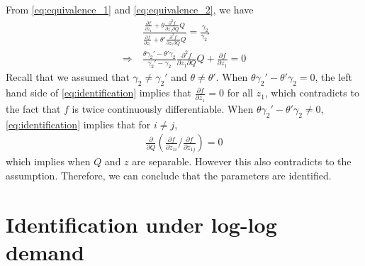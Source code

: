 \documentclass[11pt, a4paper]{article}
\numberwithin{figure}{section}
\theoremstyle{definition}
\newcommand{\0}{\mathbf{0}}
\begin{document}
From \eqref{eq:equivalence_1} and \eqref{eq:equivalence_2}, we have
\begin{align}\label{eq:identification}
    &\frac{\frac{\partial f}{\partial z_1} + \theta \frac{\partial^2 f}{\partial z_1\partial Q}Q}{\frac{\partial f}{\partial z_1} + \theta' \frac{\partial^2 f}{\partial z_1\partial Q}Q} = \frac{\gamma_2}{\gamma_2'}\nonumber\\
    \Longrightarrow\ & \frac{\theta \gamma_2' - \theta' \gamma_2}{\gamma_2' - \gamma_2}\frac{\partial^2 f}{\partial z_1\partial Q}Q  +    \frac{\partial f}{\partial z_1} = 0
\end{align}
Recall that we assumed that $\gamma_2\ne \gamma_2'$ and $\theta\ne \theta'$. When $ \theta \gamma_2' - \theta' \gamma_2 = 0$, the left hand side of \eqref{eq:identification} implies that $\frac{\partial f}{\partial z_1} = 0$ for all $z_1$, which contradicts to the fact that $f$ is twice continuously differentiable. When  $ \theta \gamma_2' - \theta' \gamma_2 \ne 0$, \eqref{eq:identification} implies that for $i \ne j$, 
\begin{align}
    \frac{\partial }{\partial Q}\left( {\frac{\partial f}{\partial z_{1i}}}/{\frac{\partial f}{\partial z_{1j}}}    \right) = 0
\end{align}
which implies when $Q$ and $z$ are separable. However this also contradicts to the assumption.
Therefore, we can conclude that the parameters are identified.



\section{Identification under log-log demand}
\end{document}
